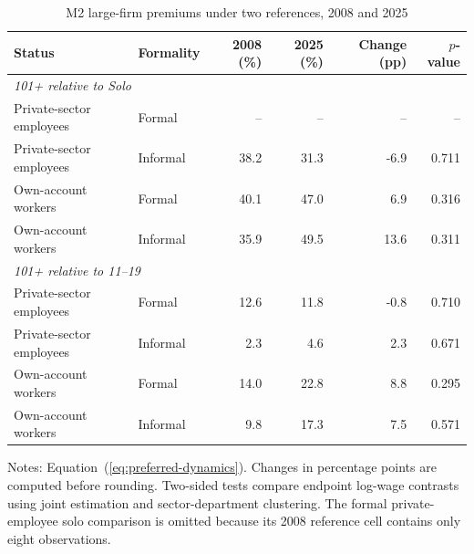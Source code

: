 \begin{table}[htbp]
\centering\small
\caption{M2 large-firm premiums under two references, 2008 and 2025}
\label{tab:status-endpoints}
\begin{tabular}{llrrrr}
\toprule
Status & Formality & 2008 (\%) & 2025 (\%) & Change (pp) & $p$-value \\
\midrule
\multicolumn{6}{l}{\textit{101+ relative to Solo}}\\
Private-sector employees & Formal & -- & -- & -- & -- \\
Private-sector employees & Informal & 38.2 & 31.3 & -6.9 & 0.711 \\
Own-account workers & Formal & 40.1 & 47.0 & 6.9 & 0.316 \\
Own-account workers & Informal & 35.9 & 49.5 & 13.6 & 0.311 \\
\midrule
\multicolumn{6}{l}{\textit{101+ relative to 11--19}}\\
Private-sector employees & Formal & 12.6 & 11.8 & -0.8 & 0.710 \\
Private-sector employees & Informal & 2.3 & 4.6 & 2.3 & 0.671 \\
Own-account workers & Formal & 14.0 & 22.8 & 8.8 & 0.295 \\
Own-account workers & Informal & 9.8 & 17.3 & 7.5 & 0.571 \\
\bottomrule
\end{tabular}
\par\vspace{0.3em}
\begin{minipage}{0.97\textwidth}\footnotesize
Notes: Equation~(\ref{eq:preferred-dynamics}). Changes in percentage points are computed before rounding. Two-sided tests compare endpoint log-wage contrasts using joint estimation and sector-department clustering. The formal private-employee solo comparison is omitted because its 2008 reference cell contains only eight observations.
\end{minipage}
\end{table}
